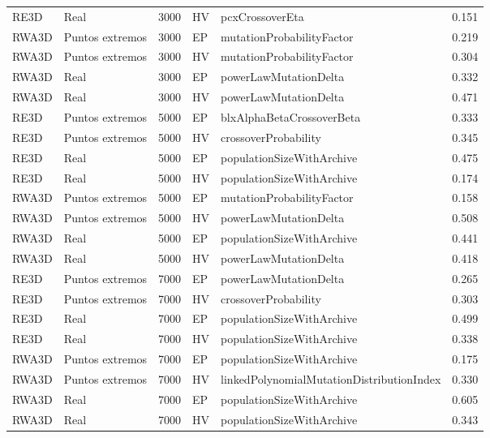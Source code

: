 \documentclass[11pt,a4paper]{article}
\begin{document}
\begin{landscape}
{\begin{longtable}{llrlll}
RE3D & Real & 3000 & HV & pcxCrossoverEta & 0.151 \\
RWA3D & Puntos extremos & 3000 & EP & mutationProbabilityFactor & 0.219 \\
RWA3D & Puntos extremos & 3000 & HV & mutationProbabilityFactor & 0.304 \\
RWA3D & Real & 3000 & EP & powerLawMutationDelta & 0.332 \\
RWA3D & Real & 3000 & HV & powerLawMutationDelta & 0.471 \\
RE3D & Puntos extremos & 5000 & EP & blxAlphaBetaCrossoverBeta & 0.333 \\
RE3D & Puntos extremos & 5000 & HV & crossoverProbability & 0.345 \\
RE3D & Real & 5000 & EP & populationSizeWithArchive & 0.475 \\
RE3D & Real & 5000 & HV & populationSizeWithArchive & 0.174 \\
RWA3D & Puntos extremos & 5000 & EP & mutationProbabilityFactor & 0.158 \\
RWA3D & Puntos extremos & 5000 & HV & powerLawMutationDelta & 0.508 \\
RWA3D & Real & 5000 & EP & populationSizeWithArchive & 0.441 \\
RWA3D & Real & 5000 & HV & powerLawMutationDelta & 0.418 \\
RE3D & Puntos extremos & 7000 & EP & powerLawMutationDelta & 0.265 \\
RE3D & Puntos extremos & 7000 & HV & crossoverProbability & 0.303 \\
RE3D & Real & 7000 & EP & populationSizeWithArchive & 0.499 \\
RE3D & Real & 7000 & HV & populationSizeWithArchive & 0.338 \\
RWA3D & Puntos extremos & 7000 & EP & populationSizeWithArchive & 0.175 \\
RWA3D & Puntos extremos & 7000 & HV & linkedPolynomialMutationDistributionIndex & 0.330 \\
RWA3D & Real & 7000 & EP & populationSizeWithArchive & 0.605 \\
RWA3D & Real & 7000 & HV & populationSizeWithArchive & 0.343 \\
\end{longtable}

}

\end{landscape}
\end{document}
